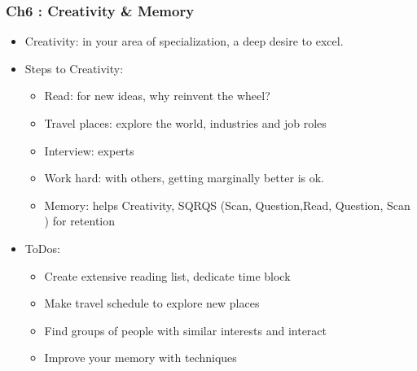 \begin{frame}[fragile]\frametitle{Ch6 : Creativity \& Memory}

\begin{itemize}
\item Creativity: in your area of specialization, a deep desire to excel. 
\item Steps to Creativity:
	\begin{itemize}
	\item Read: for new ideas, why reinvent the wheel?
	\item Travel places:  explore the world, industries and job roles
	\item Interview: experts
	\item Work hard: with others, getting marginally better is ok.
	\item Memory: helps Creativity, SQRQS (Scan, Question,Read, Question, Scan ) for retention
	\end{itemize}
\item ToDos:
	\begin{itemize}
	\item Create extensive reading list, dedicate time block
	\item Make travel schedule to explore new places
	\item Find groups of people with similar interests and interact
	\item Improve your memory with techniques
	\end{itemize}

\end{itemize}

\end{frame}

